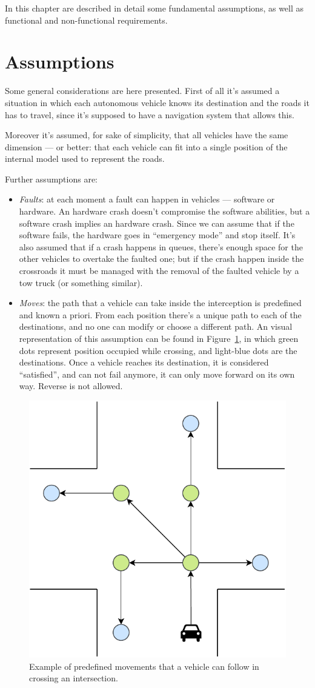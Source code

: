 \documentclass{memoir}
\begin{document}
In this chapter are described in detail some fundamental assumptions, as well as functional and non-functional requirements.

\section{Assumptions}
Some general considerations are here presented. First of all it's assumed a situation in which each autonomous vehicle knows its destination and the roads it has to travel, since it's supposed to have a navigation system that allows this.

Moreover it's assumed, for sake of simplicity, that all vehicles have the same dimension --- or better: that each vehicle can fit into a single position of the internal model used to represent the roads.

Further assumptions are:

\begin{itemize}
	\item \emph{Faults}: at each moment a fault can happen in vehicles --- software or hardware. An hardware crash doesn't compromise the software abilities, but a software crash implies an hardware crash. Since we can assume that if the software fails, the hardware goes in ``emergency mode'' and stop itself. It's also assumed that if a crash happens in queues, there's enough space for the other vehicles to overtake the faulted one; but if the crash happen inside the crossroads it must be managed with the removal of the faulted vehicle by a tow truck (or something similar).
	\item \emph{Moves}: the path that a vehicle can take inside the interception is predefined and known a priori. From each position there's a unique path to each of the destinations, and no one can modify or choose a different path. An visual representation of this assumption can be found in Figure~\ref{fig:intersection-graph}, in which green dots represent position occupied while crossing, and light-blue dots are the destinations. Once a vehicle reaches its destination, it is considered ``satisfied'', and can not fail anymore, it can only move forward on its own way. Reverse is not allowed.
\end{itemize}

\begin{figure}
	\centering
	\includegraphics[width=0.4\linewidth]{intersection_graph.pdf}
	\caption{Example of predefined movements that a vehicle can follow in crossing an intersection.}
	\label{fig:intersection-graph}
\end{figure}
\end{document}
